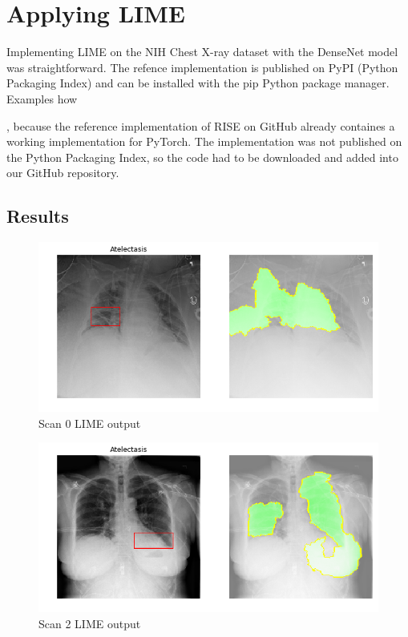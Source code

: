 \section{Applying LIME}

Implementing LIME on the NIH Chest X-ray dataset with the DenseNet model was straightforward. The refence implementation is published on PyPI (Python Packaging Index) and can be installed with the pip Python package manager. Examples how 



, because the reference implementation of RISE on GitHub \cite{risegithub} already
containes a working implementation for PyTorch. The implementation was not published on the Python Packaging Index, so the code had to be downloaded and added into our GitHub repository.


\subsection{Results}
\begin{figure}[H]
\centering
\caption{Scan 0 LIME output}
\includegraphics[width=12cm]{chapters/03_classification/images/lime_0.png}
\end{figure}

\begin{figure}[H]
\centering
\caption{Scan 2 LIME output}
\includegraphics[width=12cm]{chapters/03_classification/images/lime_2.png}
\end{figure}

